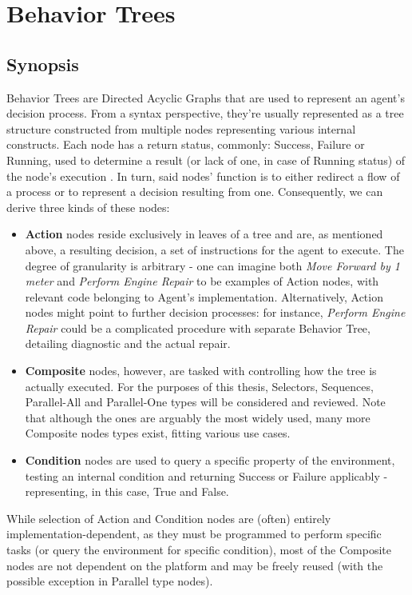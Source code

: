\section{Behavior Trees}
\subsection{Synopsis}
Behavior Trees are Directed Acyclic Graphs that are used to represent an agent's decision process. From a syntax perspective, they're usually represented as a tree structure constructed from multiple nodes representing various internal constructs. Each node has a return status, commonly: Success, Failure or Running, used to determine a result (or lack of one, in case of Running status) of the node's execution \cite{btfornextgenai}.  In turn, said nodes' function is to either redirect a flow of a process or to represent a decision resulting from one.
Consequently, we can derive three kinds of these nodes:
\begin{itemize}
    \item \textbf{Action} nodes reside exclusively in leaves of a tree and are, as mentioned above, a resulting decision, a set of instructions for the agent to execute. The degree of granularity is arbitrary - one can imagine both \textit{Move Forward by 1 meter} and \textit{Perform Engine Repair} to be examples of Action nodes, with relevant code belonging to Agent's implementation. Alternatively, Action nodes might point to further decision processes: for instance, \textit{Perform Engine Repair} could be a complicated procedure with separate Behavior Tree, detailing diagnostic and the actual repair.
    \item \textbf{Composite} nodes, however, are tasked with controlling how the tree is actually executed. For the purposes of this thesis, Selectors, Sequences, Parallel-All and Parallel-One types will be considered and reviewed. Note that although the ones are arguably the most widely used, many more Composite nodes types exist, fitting various use cases.
    \item \textbf{Condition} nodes are used to query a specific property of the environment, testing an internal condition and returning Success or Failure applicably - representing, in this case, True and False.
\end{itemize}
While selection of  Action and Condition nodes are (often) entirely implementation-dependent, as they must be programmed to perform specific tasks (or query the environment for specific condition), most of the Composite nodes are not dependent on the platform and may be freely reused (with the possible exception in Parallel type nodes).

